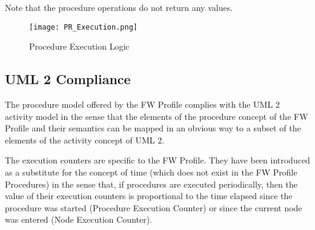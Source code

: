 Note that the procedure operations do not return any values.

\begin{figure}[ht]
 \centering
 \texttt{[image: PR\_Execution.png]}
 \caption{Procedure Execution Logic}
 \label{fig:PR_Execution}
\end{figure}

\subsection{UML 2 Compliance}
The procedure model offered by the FW Profile complies with the UML 2 activity model in
the sense that the elements of the procedure concept of the FW Profile and their semantics can
be mapped in an obvious way to a subset of the elements of the activity concept of UML 2.

The execution counters are specific to the FW Profile. They have been introduced as a
substitute for the concept of time (which does not exist in the FW Profile Procedures) in
the sense that, if procedures are executed periodically, then the value of their execution 
counters is proportional to the time elapsed since the procedure was started (Procedure
Execution Counter) or since the current node was entered (Node Execution Counter). 

